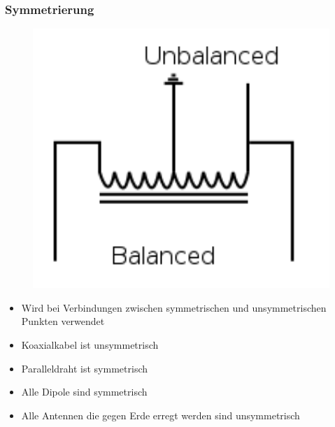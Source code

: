 \begin{frame}
\frametitle{Symmetrierung}
\begin{minipage}{0.3\textwidth}
  \begin{figure}
	\includegraphics[width=1\textwidth,height=.8\textheight,keepaspectratio]{e10/balun.png}
      \end{figure}

\end{minipage}
\begin{minipage}{0.6\textwidth}
	\begin{itemize}
		\item Wird bei Verbindungen zwischen symmetrischen und unsymmetrischen Punkten verwendet
		\item Koaxialkabel ist unsymmetrisch
		\item Paralleldraht ist symmetrisch
		\item Alle Dipole sind symmetrisch
		\item Alle Antennen die gegen Erde erregt werden sind unsymmetrisch
	\end{itemize}
\end{minipage}
\end{frame}

